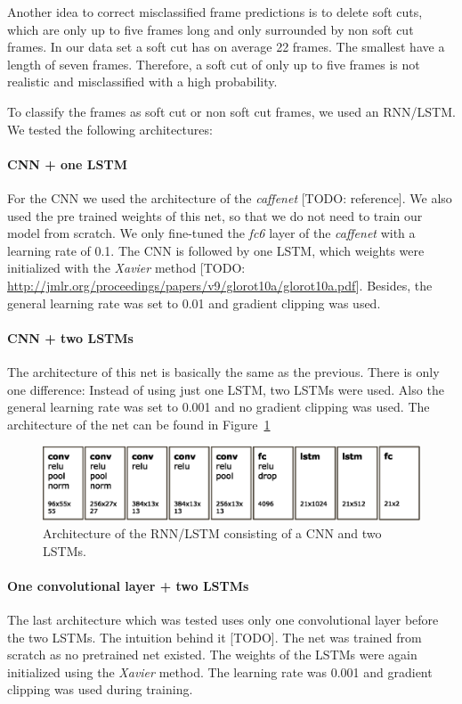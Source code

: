 Another idea to correct misclassified frame predictions is to delete soft cuts, which are only up to five frames long and only surrounded by non soft cut frames.
In our data set a soft cut has on average 22 frames.
The smallest have a length of seven frames.
Therefore, a soft cut of only up to five frames is not realistic and misclassified with a high probability.

To classify the frames as soft cut or non soft cut frames, we used an RNN/LSTM.
We tested the following architectures:

\paragraph{CNN + one LSTM}
For the CNN we used the architecture of the \textit{caffenet} [TODO: reference].
We also used the pre trained weights of this net, so that we do not need to train our model from scratch.
We only fine-tuned the \textit{fc6} layer of the \textit{caffenet} with a learning rate of 0.1.
The CNN is followed by one LSTM, which weights were initialized with the \textit{Xavier} method [TODO: \url{http://jmlr.org/proceedings/papers/v9/glorot10a/glorot10a.pdf}].
Besides, the general learning rate was set to 0.01 and gradient clipping was used.

\paragraph{CNN + two LSTMs}
The architecture of this net is basically the same as the previous.
There is only one difference: Instead of using just one LSTM, two LSTMs were used.
Also the general learning rate was set to 0.001 and no gradient clipping was used.
The architecture of the net can be found in Figure~\ref{fig:net_architecture}
\begin{figure}[!htb]
	\centering
	\includegraphics[scale=.5]{images/net_architecture.eps}
	\caption{Architecture of the RNN/LSTM consisting of a CNN and two LSTMs.}
	\label{fig:net_architecture}
\end{figure}

\paragraph{One convolutional layer + two LSTMs}
The last architecture which was tested uses only one convolutional layer before the two LSTMs.
The intuition behind it [TODO].
The net was trained from scratch as no pretrained net existed.
The weights of the LSTMs were again initialized using the \textit{Xavier} method.
The learning rate was 0.001 and gradient clipping was used during training. \\

